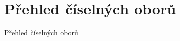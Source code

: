 \section{Přehled číselných oborů}
\label{sec:ciselne-obory-prehled}

\begin{table}[!ht]
    \centering
    
    \caption{Přehled číselných oborů}
    \label{tab:cis-obory-prehled}
\end{table}
